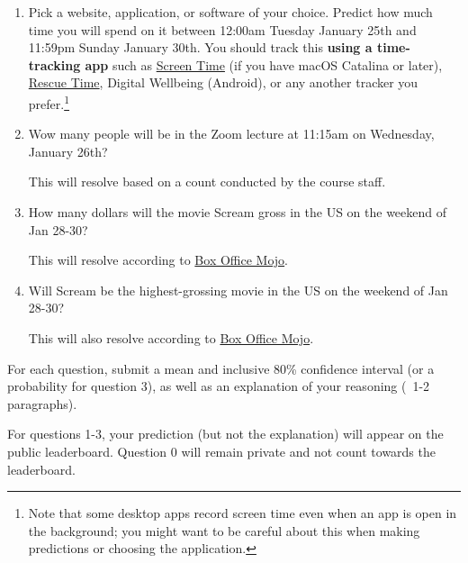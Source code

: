 \documentclass[11pt]{article}
\begin{document}
\begin{enumerate}
\item[0.] Pick a website, application, or software of your choice. Predict how much time you will spend on it between 12:00am Tuesday January 25th and 11:59pm Sunday January 30th. You should track this {\bf using a time-tracking app} such as \href{https://support.apple.com/en-us/HT210387}{Screen Time} (if you have macOS Catalina or later), \href{https://www.rescuetime.com/}{Rescue Time}, Digital Wellbeing (Android), or any another tracker you prefer.\footnote{Note that some desktop apps record screen time even when an app is open in the background; you might want to be careful about this when making predictions or choosing the application.}

\item[1.] Wow many people will be in the Zoom lecture at 11:15am on Wednesday, January 26th?

      This will resolve based on a count conducted by the course staff.

\item[2.] How many dollars will the movie Scream gross in the US on the weekend of Jan 28-30? 

      This will resolve according to \href{https://www.boxofficemojo.com/release/rl307200769/weekend/?ref_=bo_rl_tab#tabs}{Box Office Mojo}.

\item[3.] Will Scream be the highest-grossing movie in the US on the weekend of Jan 28-30?

      This will also resolve according to \href{https://www.boxofficemojo.com/weekend/?ref_=bo_nb_wey_secondarytab}{Box Office Mojo}.

\end{enumerate}
 
For each question, submit a mean and inclusive 80\% confidence interval (or a probability for question 3), 
as well as an explanation of your reasoning (~1-2 paragraphs).

For questions 1-3, your prediction (but not the explanation) will appear on the public leaderboard. 
Question 0 will remain private and not count towards the leaderboard.
\end{document}
